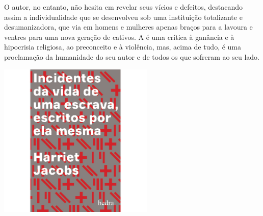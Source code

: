 O autor, no entanto, não hesita em revelar seus vícios e defeitos, destacando assim a individualidade que se desenvolveu sob uma instituição totalizante e desumanizadora, que via em homens e mulheres apenas braços para a lavoura e ventres para uma nova geração de cativos. A {} é uma crítica à ganância e à hipocrisia religiosa, ao preconceito e à violência, mas, acima de tudo, é uma proclamação da humanidade do seu autor e de todos os que sofreram ao seu lado.

\vfill

\hspace*{-.4cm}\begin{minipage}[c]{1\linewidth}
\small{
{}}
\end{minipage}

\pagebreak

\begin{center}
\hspace*{.5cm}\includegraphics[width=74mm]{./grid/jacobs.jpg}
\end{center}

\hspace*{-7cm}\hrulefill\hspace*{-7cm}

